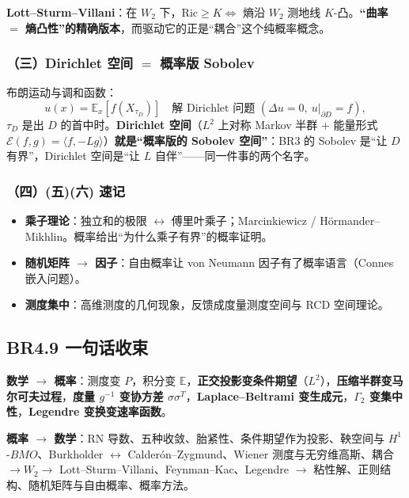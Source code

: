 \textbf{Lott--Sturm--Villani}：在 $W_2$ 下，$\mathrm{Ric}\ge K\iff$ 熵沿 $W_2$ 测地线 $K$-凸。\textbf{“曲率 $=$ 熵凸性”的精确版本}，而驱动它的正是“耦合”这个纯概率概念。

\subsubsection{（三）Dirichlet 空间 $=$ 概率版 Sobolev}

布朗运动与调和函数：
\[
u(x)=\mathbb{E}_x[f(X_{\tau_D})]\quad\text{解 Dirichlet 问题 }(\Delta u=0,\ u|_{\partial D}=f),
\]
$\tau_D$ 是出 $D$ 的首中时。\textbf{Dirichlet 空间}（$L^2$ 上对称 Markov 半群 $+$ 能量形式 $\mathcal{E}(f,g)=\langle f,-Lg\rangle$）\textbf{就是“概率版的 Sobolev 空间”}：BR3 的 Sobolev 是“让 $D$ 有界”，Dirichlet 空间是“让 $L$ 自伴”——同一件事的两个名字。

\subsubsection{（四）(五)(六) 速记}

\begin{itemize}
  \item \textbf{乘子理论}：独立和的极限 $\leftrightarrow$ 傅里叶乘子；Marcinkiewicz / H\"ormander--Mikhlin。概率给出“为什么乘子有界”的概率证明。
  \item \textbf{随机矩阵 $\to$ 因子}：自由概率让 von Neumann 因子有了概率语言（Connes 嵌入问题）。
  \item \textbf{测度集中}：高维测度的几何现象，反馈成度量测度空间与 RCD 空间理论。
\end{itemize}

\subsection{BR4.9 一句话收束}

\textbf{数学 $\to$ 概率}：测度变 $P$，积分变 $\mathbb{E}$，\textbf{正交投影变条件期望}（$L^2$），\textbf{压缩半群变马尔可夫过程}，\textbf{度量 $g^{-1}$ 变协方差 $\sigma\sigma^T$}，\textbf{Laplace--Beltrami 变生成元}，\textbf{$\Gamma_2$ 变集中性}，\textbf{Legendre 变换变速率函数}。

\textbf{概率 $\to$ 数学}：RN 导数、五种收敛、胎紧性、条件期望作为投影、鞅空间与 $H^1$-$BMO$、Burkholder $\leftrightarrow$ Calder\'on--Zygmund、Wiener 测度与无穷维高斯、耦合 $\to W_2\to$ Lott--Sturm--Villani、Feynman--Kac、Legendre $\to$ 粘性解、正则结构、随机矩阵与自由概率、概率方法。

